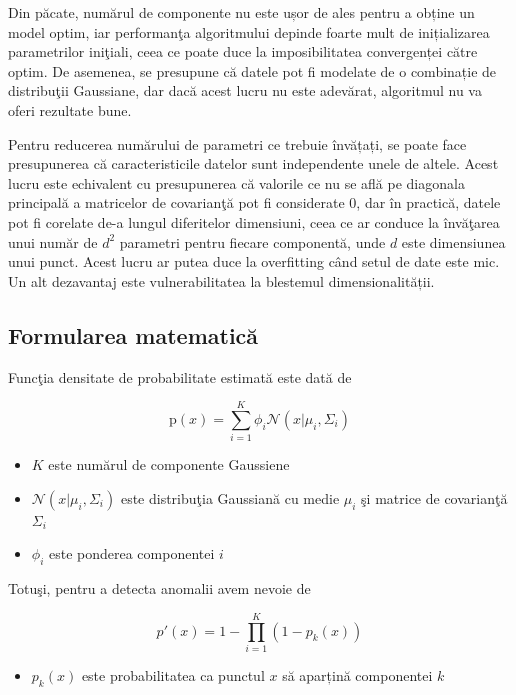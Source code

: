 Din păcate, numărul de componente nu este ușor de ales 
pentru a obține un model optim, iar performanţa algoritmului 
depinde foarte mult de inițializarea parametrilor iniţiali, 
ceea ce poate duce la imposibilitatea convergenței către optim.
De asemenea, se presupune că datele pot fi modelate de o 
combinație de distribuţii Gaussiane, dar dacă acest lucru 
nu este adevărat, algoritmul nu va oferi rezultate bune.

Pentru reducerea numărului de parametri ce trebuie învățați,
se poate face presupunerea că caracteristicile datelor 
sunt independente unele de altele. Acest lucru este 
echivalent cu presupunerea că valorile ce nu se află 
pe diagonala principală a matricelor de covarianţă
pot fi considerate 0, dar în practică, datele pot 
fi corelate de-a lungul diferitelor dimensiuni, ceea 
ce ar conduce la învăţarea unui număr de $d^2$ parametri 
pentru fiecare componentă, unde $d$ este dimensiunea unui punct.
Acest lucru ar putea duce la overfitting când setul de date 
este mic\cite{aggarwal2017outlier}.
Un alt dezavantaj este vulnerabilitatea la blestemul 
dimensionalității.

\subsection{Formularea matematică}

Funcţia densitate de probabilitate estimată este dată de

\begin{equation}
    \text{p}(x) = \sum_{i=1}^{K} \phi_i \mathcal{N}(x|\mu_i, \Sigma_i)
\end{equation}

\begin{itemize}
    \item $K$ este numărul de componente Gaussiene
    \item $\mathcal{N}(x | \mu_i, \Sigma_i)$ este distribuţia Gaussiană
    cu medie $\mu_i$ şi matrice de covarianţă $\Sigma_i$
    \item $\phi_i$ este ponderea componentei $i$
\end{itemize}

Totuşi, pentru a detecta anomalii avem nevoie de 

\begin{equation}
    p'(x) = 1 - \prod_{i=1}^{K} \left(1 - p_k(x)\right)
\end{equation}
    
\begin{itemize}
    \item $p_k(x)$ este probabilitatea ca punctul $x$ să 
    aparțină componentei $k$
\end{itemize}

